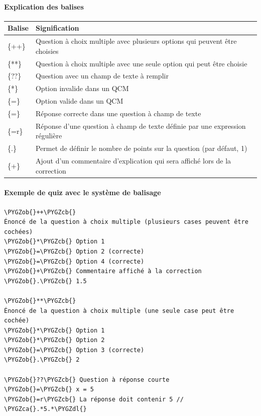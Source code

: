 \documentclass[a4,10pt,french]{sphinxmanual}
\def\PYGZob{\char`\{}
\def\PYGZcb{\char`\}}
\def\PYGZca{\char`\^}
\def\PYGZdl{\char`\$}
\begin{document}
\paragraph{Explication des balises}
\label{doc-user:explication-des-balises}
\begin{tabulary}{\linewidth}{|L|L|}
\hline
\textsf{\relax 
Balise
} & \textsf{\relax 
Signification
}\\
\hline
\{++\}
 & 
Question à choix multiple avec plusieurs options qui peuvent être choisies
\\
\hline
\{**\}
 & 
Question à choix multiple avec une seule option qui peut être choisie
\\
\hline
\{??\}
 & 
Question avec un champ de texte à remplir
\\
\hline
\{*\}
 & 
Option invalide dans un QCM
\\
\hline
\{=\}
 & 
Option valide dans un QCM
\\
\hline
\{=\}
 & 
Réponse correcte dans une question à champ de texte
\\
\hline
\{=r\}
 & 
Réponse d'une question à champ de texte définie par une expression régulière
\\
\hline
\{.\}
 & 
Permet de définir le nombre de points sur la question (par défaut, 1)
\\
\hline
\{+\}
 & 
Ajout d'un commentaire d'explication qui sera affiché lors de la correction
\\
\hline\end{tabulary}



\paragraph{Exemple de quiz avec le système de balisage}
\label{doc-user:exemple-de-quiz-avec-le-systeme-de-balisage}
\begin{Verbatim}[commandchars=\\\{\}]
\PYGZob{}++\PYGZcb{}
Énoncé de la question à choix multiple (plusieurs cases peuvent être cochées)
\PYGZob{}*\PYGZcb{} Option 1
\PYGZob{}=\PYGZcb{} Option 2 (correcte)
\PYGZob{}=\PYGZcb{} Option 4 (correcte)
\PYGZob{}+\PYGZcb{} Commentaire affiché à la correction
\PYGZob{}.\PYGZcb{} 1.5

\PYGZob{}**\PYGZcb{}
Énoncé de la question à choix multiple (une seule case peut être cochée)
\PYGZob{}*\PYGZcb{} Option 1
\PYGZob{}*\PYGZcb{} Option 2
\PYGZob{}=\PYGZcb{} Option 3 (correcte)
\PYGZob{}.\PYGZcb{} 2

\PYGZob{}??\PYGZcb{} Question à réponse courte
\PYGZob{}=\PYGZcb{} x = 5
\PYGZob{}=r\PYGZcb{} La réponse doit contenir 5 // \PYGZca{}.*5.*\PYGZdl{}
\end{Verbatim}
\end{document}
